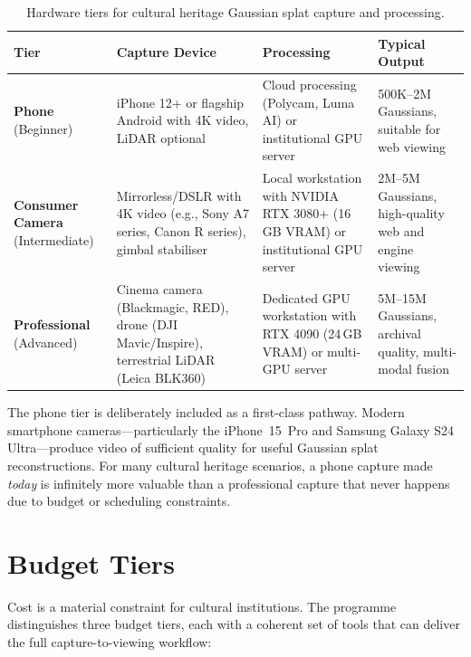 \begin{table}[htbp]
  \centering
  \caption{Hardware tiers for cultural heritage Gaussian splat capture and processing.}
  \label{tab:hardware-tiers}
  \begin{tabular}{@{}L{2.2cm}L{3.5cm}L{3.5cm}L{4cm}@{}}
    \toprule
    \textbf{Tier} & \textbf{Capture Device} & \textbf{Processing} & \textbf{Typical Output} \\
    \midrule
    \textbf{Phone} (Beginner)
      & iPhone 12+ or flagship Android with 4K video, LiDAR optional
      & Cloud processing (Polycam, Luma AI) or institutional GPU server
      & 500K--2M Gaussians, suitable for web viewing \\
    \addlinespace
    \textbf{Consumer Camera} (Intermediate)
      & Mirrorless/DSLR with 4K video (e.g., Sony A7 series, Canon R series), gimbal stabiliser
      & Local workstation with NVIDIA RTX 3080+ (16\,GB VRAM) or institutional GPU server
      & 2M--5M Gaussians, high-quality web and engine viewing \\
    \addlinespace
    \textbf{Professional} (Advanced)
      & Cinema camera (Blackmagic, RED), drone (DJI Mavic/Inspire), terrestrial LiDAR (Leica BLK360)
      & Dedicated GPU workstation with RTX 4090 (24\,GB VRAM) or multi-GPU server
      & 5M--15M Gaussians, archival quality, multi-modal fusion \\
    \bottomrule
  \end{tabular}
\end{table}

\begin{technote}
The phone tier is deliberately included as a first-class pathway. Modern smartphone cameras---particularly the iPhone~15~Pro and Samsung Galaxy S24 Ultra---produce video of sufficient quality for useful Gaussian splat reconstructions. For many cultural heritage scenarios, a phone capture made \emph{today} is infinitely more valuable than a professional capture that never happens due to budget or scheduling constraints.
\end{technote}

\section{Budget Tiers}
\label{sec:train-budget}

Cost is a material constraint for cultural institutions. The programme distinguishes three budget tiers, each with a coherent set of tools that can deliver the full capture-to-viewing workflow:

